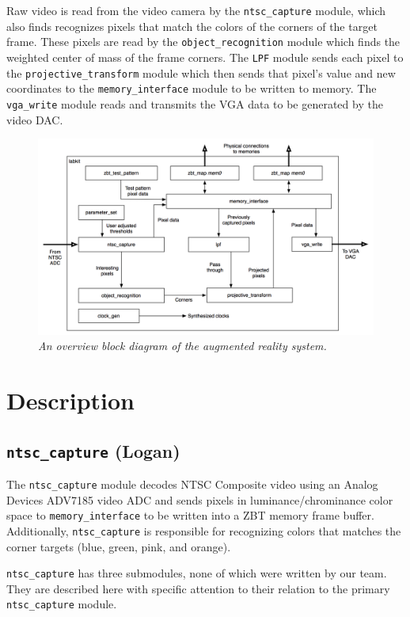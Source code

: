 \documentclass[10pt]{article}
\begin{document}
Raw video is read from the video camera by the {\tt ntsc\_capture} module, which also finds recognizes pixels that match the colors of the corners of the target frame. These pixels are read by the {\tt object\_recognition} module which finds the weighted center of mass of the frame corners. The {\tt LPF} module sends each pixel to the {\tt projective\_transform} module which then sends that pixel's value and new coordinates to the {\tt memory\_interface} module to be written to memory. The {\tt vga\_write} module reads and transmits the VGA data to be generated by the video DAC.

\begin{figure}[h!]
\centering
\includegraphics[width=\textwidth]{images/simplified_block_diagram.png}
\caption{\emph{An overview block diagram of the augmented reality system.}}
\end{figure}

\section{Description}

\subsection{{\tt ntsc\_capture} (Logan)}
The {\tt ntsc\_capture} module decodes NTSC Composite video using an Analog Devices ADV7185 video ADC and sends pixels in luminance/chrominance color space to {\tt memory\_interface} to be written into a ZBT memory frame buffer. Additionally, {\tt ntsc\_capture} is responsible for recognizing colors that matches the corner targets (blue, green, pink, and orange).

{\tt ntsc\_capture} has three submodules, none of which were written by our team. They are described here with specific attention to their relation to the primary {\tt ntsc\_capture} module.
\end{document}
